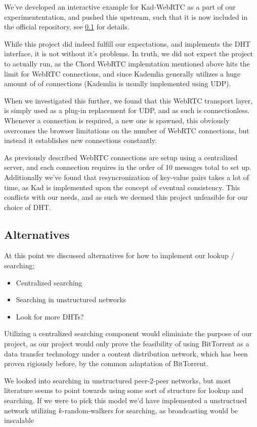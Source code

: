 We've developed an interactive example for Kad-WebRTC as a part of our
experimententation, and pushed this upstream, such that it is now included in 
the official repository, see \ref{} for details.

While this project did indeed fulfill our expectations, and implements the DHT
interface, it is not without it's problems. In truth, we did not expect the 
project to actually run, as the Chord WebRTC implemtation mentioned above hits
the limit for WebRTC connections, and since Kademlia generally utilizes a huge
amount of of connections (Kademlia is usually implemented using UDP).

When we investigated this further, we found that this WebRTC transport layer,
is simply used as a plug-in replacement for UDP, and as such is connectionless.
Whenever a connection is required, a new one is spawned, this obviously
overcomes the browser limitations on the number of WebRTC connections, but 
instead it establishes new connections constantly.

As previously described WebRTC connections are setup using a centralized server,
and each connection requires in the order of 10 messages total to set up.
Additionally we've found that resyncronization of key-value pairs takes a lot
of time, as Kad is implemented upon the concept of eventual consistency. This
conflicts with our needs, and as such we deemed this project unfeasible for
our choice of DHT.

\subsection{Alternatives}
At this point we discussed alternatives for how to implement our lookup /
searching;
\begin{itemize}
\item Centralized searching
\item Searching in unstructured networks
\item Look for more DHTs?
\end{itemize}

Utilizing a centralized searching component would eliminiate the purpose of our
project, as our project would only prove the feasibility of using BitTorrent as
a data transfer technology under a content distribution network, which has been
proven rigiously before, by the common adaptation of BitTorrent.

We looked into searching in unstructured peer-2-peer networks, but most
literature seems to point towards using some sort of structure for lookup and 
searching. If we were to pick this model we'd have implemented a unstructued 
network utilizing $k$-random-walkers for searching, as broadcasting would be 
inscalable \citep{}


